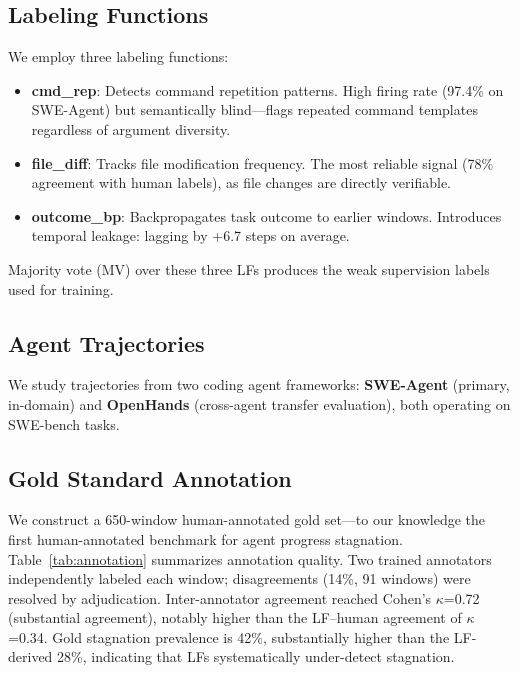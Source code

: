 \documentclass[11pt,a4paper]{article}
\begin{document}
\subsection{Labeling Functions}

We employ three labeling functions:

\begin{itemize}
\item \textbf{cmd\_rep}: Detects command repetition patterns. High firing rate (97.4\% on SWE-Agent) but semantically blind---flags repeated command templates regardless of argument diversity.
\item \textbf{file\_diff}: Tracks file modification frequency. The most reliable signal (78\% agreement with human labels), as file changes are directly verifiable.
\item \textbf{outcome\_bp}: Backpropagates task outcome to earlier windows. Introduces temporal leakage: lagging by +6.7 steps on average.
\end{itemize}

Majority vote (MV) over these three LFs produces the weak supervision labels used for training.

\subsection{Agent Trajectories}

We study trajectories from two coding agent frameworks: \textbf{SWE-Agent} (primary, in-domain) and \textbf{OpenHands} (cross-agent transfer evaluation), both operating on SWE-bench tasks.

\subsection{Gold Standard Annotation}
\label{sec:gold}

We construct a 650-window human-annotated gold set---to our knowledge the first human-annotated benchmark for agent progress stagnation.
Table~\ref{tab:annotation} summarizes annotation quality.
Two trained annotators independently labeled each window; disagreements (14\%, 91 windows) were resolved by adjudication.
Inter-annotator agreement reached Cohen's $\kappa$=0.72 (substantial agreement), notably higher than the LF--human agreement of $\kappa$=0.34.
Gold stagnation prevalence is 42\%, substantially higher than the LF-derived 28\%, indicating that LFs systematically under-detect stagnation.
\end{document}
